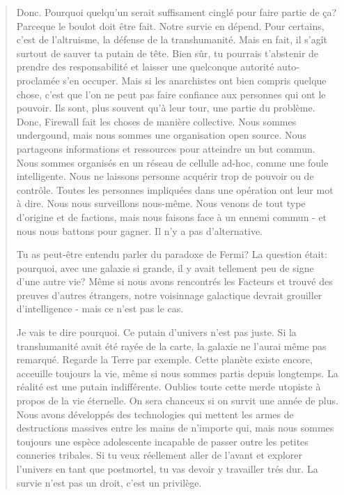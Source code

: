 \begin{quotation}
Donc. Pourquoi quelqu'un serait suffisament cinglé pour faire partie de ça? Parceque le boulot doit être fait. Notre survie en dépend. Pour certains, c'est de l'altruisme, la défense de la transhumanité. Mais en fait, il s'agît surtout de sauver ta putain de tête. Bien sûr, tu pourrais t'abstenir de prendre des responsabilité et laisser une quelconque autorité auto-proclamée s'en occuper. Mais si les anarchistes ont bien compris quelque chose, c'est que l'on ne peut pas faire confiance aux personnes qui ont le pouvoir. Ils sont, plus souvent qu'à leur tour, une partie du problème. Donc, Firewall fait les choses de manière collective. Nous sommes undergound, mais nous sommes une organisation open source. Nous partageons informations et ressources pour atteindre un but commun. Nous sommes organisés en un réseau de cellulle ad-hoc, comme une foule intelligente. Nous ne laissons personne acquérir trop de pouvoir ou de contrôle. Toutes les personnes impliquées dans une opération ont leur mot à dire. Nous nous surveillons nous-même. Nous venons de tout type d'origine et de factions, mais nous faisons face à un ennemi commun - et nous nous battons pour gagner. Il n'y a pas d'alternative. 

Tu as peut-être entendu parler du paradoxe de Fermi? La question était: pourquoi, avec une galaxie si grande, il y avait tellement peu de signe d'une autre vie? Même si nous avons rencontrés les Facteurs et trouvé des preuves d'autres étrangers, notre voisinnage galactique devrait grouiller d'intelligence - mais ce n'est pas le cas. 

Je vais te dire pourquoi. Ce putain d'univers n'est pas juste. Si la transhumanité avait été rayée de la carte, la galaxie ne l'aurai même pas remarqué. Regarde la Terre par exemple. Cette planète existe encore, acceuille toujours la vie, même si nous sommes partis depuis longtemps. La réalité est une putain indifférente. Oublies toute cette merde utopiste à propos de la vie éternelle. On sera chanceux si on survit une année de plus. Nous avons développés des technologies qui mettent les armes de destructions massives entre les mains de n'importe qui, mais nous sommes toujours une espèce adolescente incapable de passer outre les petites conneries tribales. Si tu veux réellement aller de l'avant et explorer l'univers en tant que postmortel, tu vas devoir y travailler trés dur. La survie n'est pas un droit, c'est un privilège. 


\end{quotation}
